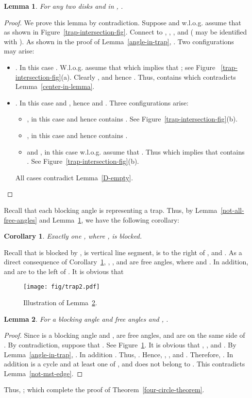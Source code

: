 \documentclass[11pt,a4paper]{article}
\newtheorem{lemma}{Lemma}
\newtheorem{corollary}{Corollary}
\begin{document}
\begin{lemma}
\label{intersecting-trap}
For any two disks  and  in , .
\end{lemma}
\begin{proof}
 We prove this lemma by contradiction. Suppose  and w.l.o.g. assume that  as shown in Figure~\ref{trap-intersection-fig}. Connect  to , , , and  ( may be identified with ). As shown in the proof of Lemma~\ref{angle-in-trap}, . Two configurations may arise: 
\begin{itemize}
 \item . In this case . W.l.o.g. assume that  which implies that ; see Figure ~\ref{trap-intersection-fig}(a). Clearly , and hence . Thus,  contains  which contradicts Lemma~\ref{center-in-lemma}.
  \item . In this case  and , hence  and . Three configurations arise:

\begin{itemize}
 \item , in this case  and hence  contains . See Figure~\ref{trap-intersection-fig}(b).
  \item , in this case  and hence  contains . 
  \item  and , in this case w.l.o.g. assume that . Thus  which implies that  contains . See Figure~\ref{trap-intersection-fig}(b).
\end{itemize}
All cases contradict Lemma~\ref{D-empty}. 
\end{itemize}
\end{proof}

Recall that each blocking angle is representing a trap. Thus, by Lemma~\ref{not-all-free-angles} and Lemma~\ref{intersecting-trap}, we have the following corollary:

\begin{corollary}
\label{one-blocked-angle}
Exactly one , where , is blocked.
\end{corollary}
Recall that  is blocked by ,  is vertical line segment,  is to the right of , and . As a direct consequence of Corollary~\ref{one-blocked-angle}, , , and  are free angles, where  and . In addition,  and  are to the left of . It is obvious that 

\begin{figure}[htb]
  \centering
  \texttt{[image: fig/trap2.pdf]}
 \caption{Illustration of Lemma~\ref{intersecting-trap2}.}
  \label{trap2-fig}
\end{figure}

\begin{lemma}
\label{intersecting-trap2}
For a blocking angle  and free angles  and , . 
\end{lemma}
\begin{proof}
Since  is a blocking angle and ,  are free angles,  and  are on the same side of .
 By contradiction, suppose that . See Figure~\ref{trap2-fig}. It is obvious that , , and . By Lemma~\ref{angle-in-trap}, . In addition . Thus, . Hence, , , and . Therefore, . In addition  is a cycle and at least one of ,  and  does not belong to . This contradicts Lemma~\ref{not-mst-edge}. 
\end{proof}
Thus, ; which complete the proof of Theorem~\ref{four-circle-theorem}.
\end{document}
